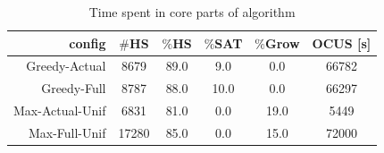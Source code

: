 \begin{table}
  \centering
  \begin{tabular}{|r|c|c|c|c|c|}
    \hline
    config &    $\#$HS &   $\%$HS &  $\%$SAT &  $\%$Grow &  OCUS [s] \\
    \hline
    Greedy-Actual &   8679 &  89.0 &   9.0 &    0.0 &      66782 \\
    Greedy-Full &   8787 &  88.0 &   10.0 &    0.0 &      66297 \\
    Max-Actual-Unif &   6831 &  81.0 &   0.0 &   19.0 &       5449 \\
    Max-Full-Unif &  17280 &  85.0 &   0.0 &   15.0 &      72000 \\
    \hline
  \end{tabular}
  \caption{Time spent in core parts of \comus algorithm}
  \end{table}
  








